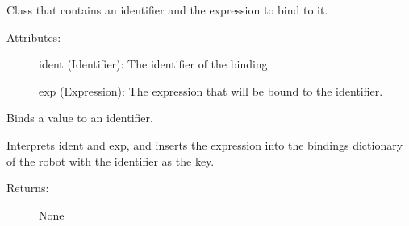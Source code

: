 \documentclass[letterpaper,10pt,english]{sphinxmanual}
\begin{document}
\begin{fulllineitems}
\label{\detokenize{robol:robol_lang.robol.Binding}}
\sphinxAtStartPar
Class that contains an identifier and the expression to bind to it.
\begin{description}
\item[{Attributes:}] \leavevmode
\sphinxAtStartPar
ident (Identifier): The identifier of the binding

\sphinxAtStartPar
exp (Expression): The expression that will be bound to the identifier.

\end{description}

\begin{fulllineitems}
\label{\detokenize{robol:robol_lang.robol.Binding.interpret}}
\sphinxAtStartPar
Binds a value to an identifier.

\sphinxAtStartPar
Interprets ident and exp, and inserts the expression into the bindings
dictionary of the robot with the identifier as the key.
\begin{description}
\item[{Returns:}] \leavevmode
\sphinxAtStartPar
None

\end{description}

\end{fulllineitems}


\end{fulllineitems}

\end{document}
